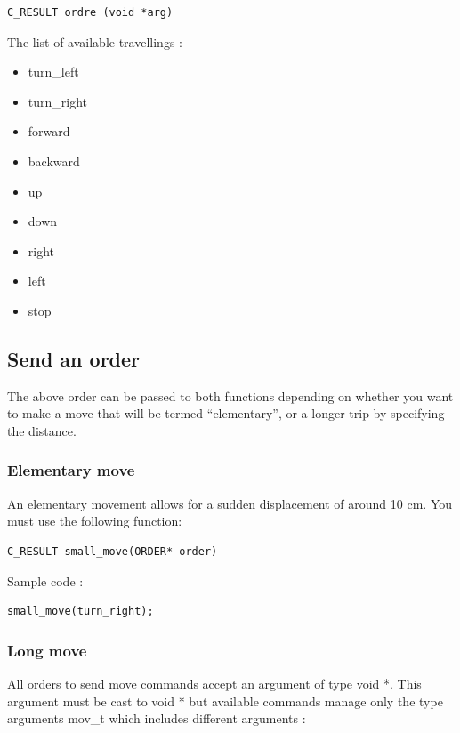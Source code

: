 \begin{lstlisting}
C_RESULT ordre (void *arg)
\end{lstlisting}

The list of available travellings :\\

\begin{itemize}

\item turn\_left 
\item turn\_right
\item forward    
\item backward   
\item up         
\item down       
\item right      
\item left       
\item stop       

\end{itemize}

\subsection{Send an order}

The above order can be passed to both functions depending on whether you want to make a move that will be termed ``elementary'', or a longer trip by specifying the distance.

\subsubsection{Elementary move}

An elementary movement allows for a sudden displacement of around 10 cm. You must use the following function:

\begin{lstlisting}
C_RESULT small_move(ORDER* order)
\end{lstlisting}

Sample code :\\

\begin{lstlisting}
small_move(turn_right);
\end{lstlisting}

\subsubsection{Long move}

All orders to send move commands accept an argument of type void *. This argument must be cast to void * but available commands manage only the type arguments mov\_t which includes different arguments :\\


